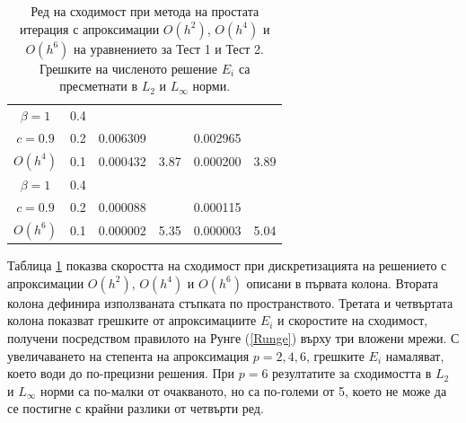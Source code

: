\documentclass[a4paper]{article}
\newcommand{\rf}[1]{(\ref{#1})}
\theoremstyle{remark}
\begin{document}
\begin{large}
\begin{table}[ht]
\begin{tabular}{||c|l|ll|ll||}
\hline 	
 $\beta = 1$   	&0.4  &            &               &               &     \\
     $c=0.9$  	&0.2   & 0.006309  &              & 0.002965      &        \\
     $O(h^4)$	&0.1  &  0.000432 &3.87        & 0.000200 &  3.89        \\
    \hline
 $\beta = 1$	&0.4   &             &        &               &        \\
   $ c=0.9$  	&0.2   &  0.000088  &        & 0.000115      &       \\
       $O(h^6)$	&0.1  &   0.000002 &5.35  & 0.000003 &   5.04       \\
	   \hline
			\hline 
		\end{tabular}
		\caption{Ред на сходимост при метода на простата итерация с апроксимации $O(h^{2})$, $O(h^{4})$ и $O(h^{6})$ на уравнението за Тест  1 и Тест 2. Грешките на численото решение $E_i$ са пресметнати в $L_2$ и $L_\infty$ норми.}
\label{tab:a}
\end{table}
\FloatBarrier
Таблица \ref{tab:a} показва скоростта на сходимост при дискретизацията на решението с апроксимации $O(h^{2})$, $O(h^{4})$ и $O(h^{6})$ описани в първата колона. Втората колона дефинира използваната стъпката по пространството. Третата и четвъртата колона показват грешките от апроксимациите $E_i$ и скоростите на сходимост, получени посредством правилото на Рунге \rf{Runge} върху три вложени мрежи. С увеличаването на степента на апроксимация $p=2,4,6$, грешките $E_i$ намаляват, което води до по-прецизни решения. При $p=6$ резултатите за сходимостта в $L_2$ и $L_\infty$ норми са по-малки от очакваното, но са по-големи от 5, което не може да се постигне с крайни разлики от четвърти ред.


\end{large}
\end{document}
